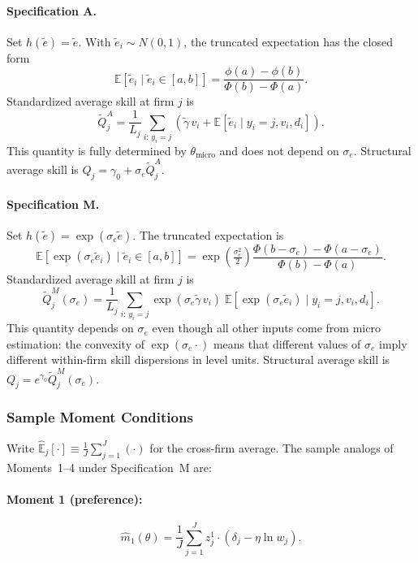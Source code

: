 \documentclass[11pt]{article}
\begin{document}
\paragraph{Specification A.} Set $h(\tilde e) = \tilde e$. With $\tilde e_i\sim N(0,1)$, the truncated expectation has the closed form
\[
\mathbb{E}[\tilde e_i \mid \tilde e_i\in[a,b]] = \frac{\phi(a)-\phi(b)}{\Phi(b)-\Phi(a)}.
\]
Standardized average skill at firm $j$ is
\begin{equation}\label{eq:Qhat_A}
\tilde Q_j^A = \frac{1}{L_j}\sum_{i:\,y_i=j}\left(\tilde\gamma\, v_i + \mathbb{E}[\tilde e_i \mid y_i=j, v_i, d_i]\right).
\end{equation}
This quantity is fully determined by $\theta_{\text{micro}}$ and does not depend on $\sigma_e$. Structural average skill is $Q_j = \gamma_0 + \sigma_e\tilde Q_j^A$.

\paragraph{Specification M.} Set $h(\tilde e) = \exp(\sigma_e\tilde e)$. The truncated expectation is
\[
\mathbb{E}[\exp(\sigma_e\tilde e_i) \mid \tilde e_i\in[a,b]] = \exp\!\left(\tfrac{\sigma_e^2}{2}\right)\frac{\Phi(b-\sigma_e)-\Phi(a-\sigma_e)}{\Phi(b)-\Phi(a)}.
\]
Standardized average skill at firm $j$ is
\begin{equation}\label{eq:Qhat_M}
\tilde Q_j^M(\sigma_e) = \frac{1}{L_j}\sum_{i:\,y_i=j}\exp(\sigma_e\tilde\gamma\, v_i)\;\mathbb{E}[\exp(\sigma_e\tilde e_i) \mid y_i=j, v_i, d_i].
\end{equation}
This quantity depends on $\sigma_e$ even though all other inputs come from micro estimation: the convexity of $\exp(\sigma_e\cdot)$ means that different values of $\sigma_e$ imply different within-firm skill dispersions in level units. Structural average skill is $Q_j = e^{\gamma_0}\tilde Q_j^M(\sigma_e)$.

\subsubsection{Sample Moment Conditions}\label{sec:sample_moments}

Write $\hat{\mathbb{E}}_j[\cdot] \equiv \frac{1}{J}\sum_{j=1}^J(\cdot)$ for the cross-firm average. The sample analogs of Moments~1--4 under Specification~M are:

\paragraph{Moment 1 (preference):}
\begin{equation}\label{eq:sm1}
\hat m_1(\theta) = \frac{1}{J}\sum_{j=1}^J z_j^1\cdot(\delta_j - \eta\ln w_j).
\end{equation}
\end{document}
